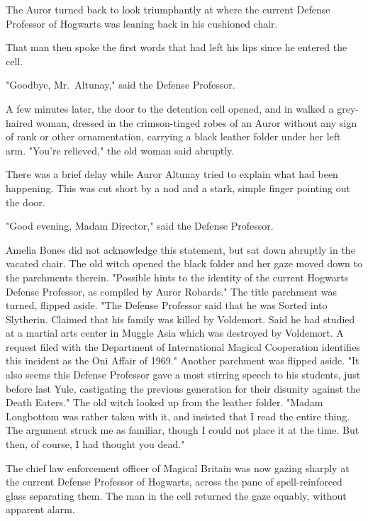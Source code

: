 The Auror turned back to look triumphantly at where the current Defense
Professor of Hogwarts was leaning back in his cushioned chair.

That man then spoke the first words that had left his lips since he entered the
cell.

"Goodbye, Mr.~Altunay," said the Defense Professor.

A few minutes later, the door to the detention cell opened, and in walked a
grey-haired woman, dressed in the crimson-tinged robes of an Auror without any
sign of rank or other ornamentation, carrying a black leather folder under her
left arm. "You're relieved," the old woman said abruptly.

There was a brief delay while Auror Altunay tried to explain what had been
happening. This was cut short by a nod and a stark, simple finger pointing out
the door.

"Good evening, Madam Director," said the Defense Professor.

Amelia Bones did not acknowledge this statement, but sat down abruptly in the
vacated chair. The old witch opened the black folder and her gaze moved down to
the parchments therein. "Possible hints to the identity of the current Hogwarts
Defense Professor, as compiled by Auror Robards." The title parchment was
turned, flipped aside. "The Defense Professor said that he was Sorted into
Slytherin. Claimed that his family was killed by Voldemort. Said he had studied
at a martial arts center in Muggle Asia which was destroyed by Voldemort. A
request filed with the Department of International Magical Cooperation
identifies this incident as the Oni Affair of 1969." Another parchment was
flipped aside. "It also seems this Defense Professor gave a most stirring
speech to his students, just before last Yule, castigating the previous
generation for their disunity against the Death Eaters." The old witch looked
up from the leather folder. "Madam Longbottom was rather taken with it, and
insisted that I read the entire thing. The argument struck me as familiar,
though I could not place it at the time. But then, of course, I had thought you
dead."

The chief law enforcement officer of Magical Britain was now gazing sharply at
the current Defense Professor of Hogwarts, across the pane of spell-reinforced
glass separating them. The man in the cell returned the gaze equably, without
apparent alarm.

